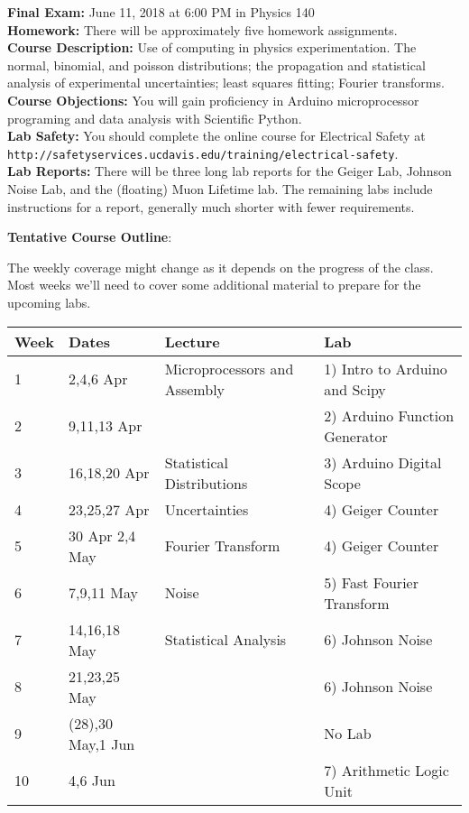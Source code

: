 \documentclass[12pt]{article}
\begin{document}
\textbf{Final Exam:} June 11, 2018 at 6:00 PM in Physics 140 \\
\textbf{Homework:}  There will be approximately five homework assignments.\\

\noindent
\textbf {Course Description:}  
Use of computing in physics experimentation.  The normal, binomial, and poisson distributions;  the propagation and statistical analysis of experimental uncertainties;  least squares fitting; Fourier transforms.\\

\noindent
\textbf {Course Objections:} 
You will gain proficiency in Arduino microprocessor programing and data analysis with Scientific Python.\\

\noindent
\textbf {Lab Safety:} 
You should complete the online course for Electrical Safety at \\
{\tt http://safetyservices.ucdavis.edu/training/electrical-safety}.\\

\noindent
\textbf {Lab Reports:} 
There will be three long lab reports for the Geiger Lab, Johnson Noise Lab, and the (floating) Muon Lifetime lab.  The remaining labs include instructions for a report, generally much shorter with fewer requirements.

\vskip 0.5cm
\noindent
\textbf {Tentative Course Outline}:

The weekly coverage might change as it depends on the progress of the class.    Most weeks we'll need to cover some additional material to prepare for the upcoming labs.



\begin{table}[h!]
\normalsize %
\begin{tabular}{ llll }
\hline
\textbf{Week} & \textbf{Dates} & \textbf{Lecture} & \textbf{Lab} \\
\hline
1 & 2,4,6 Apr & Microprocessors and Assembly & 1) Intro to Arduino and Scipy \\
\hline
2 & 9,11,13 Apr &  & 2) Arduino Function Generator \\
\hline
3 & 16,18,20 Apr & Statistical Distributions & 3) Arduino Digital Scope  \\
\hline
4 & 23,25,27 Apr & Uncertainties & 4) Geiger Counter \\
\hline
5 & 30 Apr 2,4 May & Fourier Transform & 4) Geiger Counter \\
\hline
6 & 7,9,11 May & Noise & 5) Fast Fourier Transform \\
\hline
7 & 14,16,18 May & Statistical Analysis  & 6) Johnson Noise \\
\hline
8 & 21,23,25 May & & 6) Johnson Noise\\
\hline
9 & (28),30 May,1 Jun & &  No Lab \\
\hline
10 &  4,6 Jun &  & 7)  Arithmetic Logic Unit\\
\hline
\end{tabular} 
\end{table}
\end{document}
